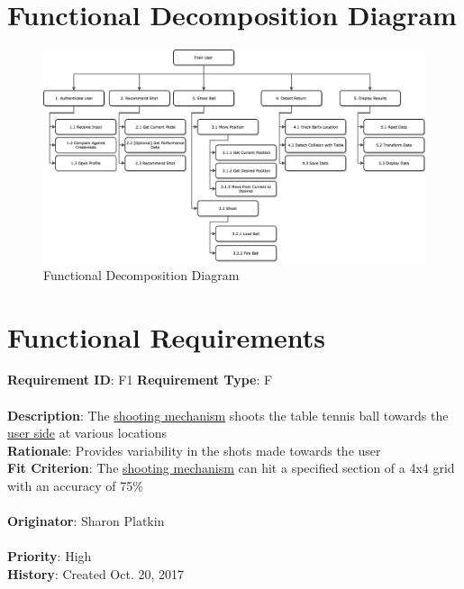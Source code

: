 \documentclass[11pt]{article}
\begin{document}
\section{Functional Decomposition Diagram}
\begin{figure}[H]
   \centering
   \includegraphics[width=\textwidth]{diagrams/FDD.png}
   \caption{Functional Decomposition Diagram}
   \label{fig:fdd}
\end{figure}

\section{Functional Requirements}

\begin{framed}
	\noindent\textbf{Requirement ID}: F1 \hfill \textbf{Requirement Type}: F \hfill\\\\
	\noindent\textbf{Description}: The \hyperref[sec:definitions]{shooting mechanism} shoots the table tennis ball towards the \hyperref[sec:definitions]{user side} at various locations \\
	\textbf{Rationale}: Provides variability in the shots made towards the user \\
	\textbf{Fit Criterion}: The \hyperref[sec:definitions]{shooting mechanism} can hit a specified section of a 4x4 grid with an accuracy of 75\%\\\\
	\textbf{Originator}: Sharon Platkin \\\\
	\textbf{Priority}: High \hfill \\
	\noindent\textbf{History}: Created Oct. 20, 2017
\end{framed}
\end{document}
